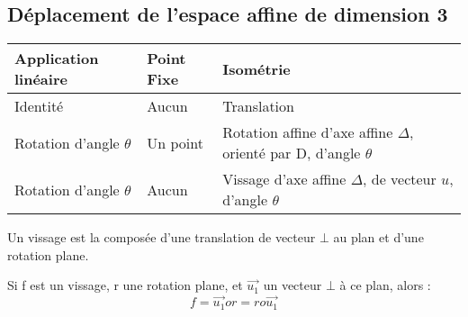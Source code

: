 \subsection{Déplacement de l'espace affine de dimension 3}
\begin{center}
\begin{tabular}{|l|l|l|}
\hline
Application linéaire & Point Fixe & Isométrie \\ \hline
Identité & Aucun & Translation \\ \hline
Rotation d'angle $\theta$ & Un point & Rotation affine d'axe affine $\Delta$, orienté par D, d'angle $\theta$ \\ \hline
Rotation d'angle $\theta$ & Aucun & Vissage d'axe affine $\Delta$, de vecteur $u$, d'angle $\theta$ \\ \hline
\end{tabular}
\end{center}
Un vissage est la composée d'une translation de vecteur $\bot$ au plan et d'une rotation plane.
\begin{prop}
Si f est un vissage, r une rotation plane, et $\overrightarrow{u_1}$ un vecteur $\bot$ à ce plan, alors :
$$f = \overrightarrow{u_1} o r = r o \overrightarrow{u_1}$$
\end{prop}

